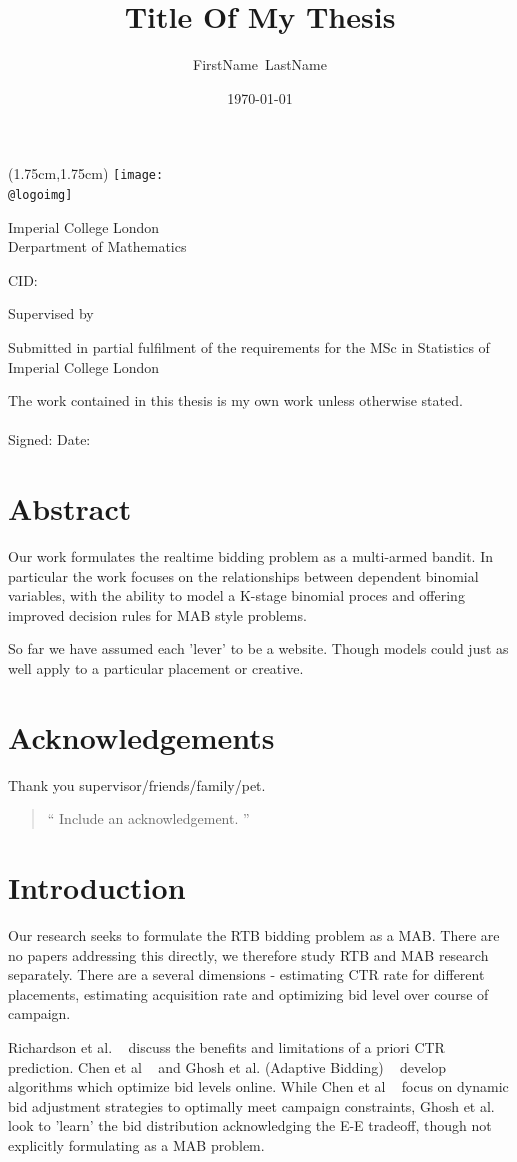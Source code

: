 \documentclass[11pt,a4,singlespacing,titlepagenumber=on]{scrreprt}
\title{Title Of My Thesis}
\author{FirstName~LastName}
\date{\today}
\makeatletter
\numberwithin{equation}{chapter} %
\theoremstyle{remark}
\renewcommand{\maketitle}{
\begin{titlepage}
\ifdefined\@logoimg
\begin{textblock*}{8cm}(1.75cm,1.75cm)
\texttt{[image: \\@logoimg]}
\end{textblock*}
\vspace*{1cm}
\else
\fi
\begin{center}
\vspace*{\stretch{0.1}}
Imperial College London\\
Derpartment of Mathematics\par
\vspace*{\stretch{1}} %
{\titlefont\Huge \@title\par} %
\vspace*{\stretch{2}}
{\Large \@author \par}
\vspace*{1em}
{\large CID: \@CID \par}
\vspace*{\stretch{0.5}}
{\large Supervised by \@supervisor \par}
\vspace*{\stretch{3}}
{\Large \@date \par}
\vspace*{\stretch{1}}
{\large Submitted in partial fulfilment of the requirements for the
MSc in Statistics of Imperial College London}
\vspace*{\stretch{0.1}}
\end{center}%
\end{titlepage}%
}
\newcommand*{\declaration}{%
\vspace*{0.3\textheight}
The work contained in this thesis is my own work unless
otherwise stated.\\
\vspace*{0.1\textheight}\\
\hspace*{0.25\textwidth}Signed: \hspace{0.25\textwidth} Date:
\clearpage}
\renewenvironment{abstract}%
{\chapter*{Abstract}\thispagestyle{plain}}%
{\clearpage}
\newenvironment{myquote}%
{\begin{quote}{\Large{}``}}%
{{\Large{}''}\end{quote}}
\makeatother
\begin{document}
\maketitle %

\declaration %

\begin{abstract}

Our work formulates the realtime bidding problem as a multi-armed bandit. In particular the work focuses on the relationships between dependent binomial variables, with the ability to model a K-stage binomial proces and offering improved decision rules for MAB style problems.

So far we have assumed each 'lever' to be a website. Though models could just as well apply to a particular placement or creative.

\end{abstract}

\newpage
\chapter*{Acknowledgements}
Thank you supervisor/friends/family/pet.
\begin{myquote}
Include an acknowledgement.
\end{myquote}
\newpage

\renewcommand{\contentsname}{Table of Contents}
\tableofcontents
\newpage




\chapter{Introduction}

Our research seeks to formulate the RTB bidding problem as a MAB. There are no papers addressing this directly, we therefore study RTB and MAB research separately. There are a several dimensions - estimating CTR rate for different placements, estimating acquisition rate and optimizing bid level over course of campaign.

Richardson et al. ~\cite{Richardson:2007:PCE:1242572.1242643} discuss the benefits and limitations of a priori CTR prediction. Chen et al ~\cite{Chen:2011:RBA:2020408.2020604} and Ghosh et al. (Adaptive Bidding) ~\cite{Ghosh:2009:ABD:1526709.1526744} develop algorithms which optimize bid levels online. While Chen et al ~\cite{Chen:2011:RBA:2020408.2020604} focus on dynamic bid adjustment strategies to optimally meet campaign constraints, Ghosh et al. ~\cite{raey} look to 'learn' the bid distribution acknowledging the E-E tradeoff, though not explicitly formulating as a MAB problem.
\end{document}
